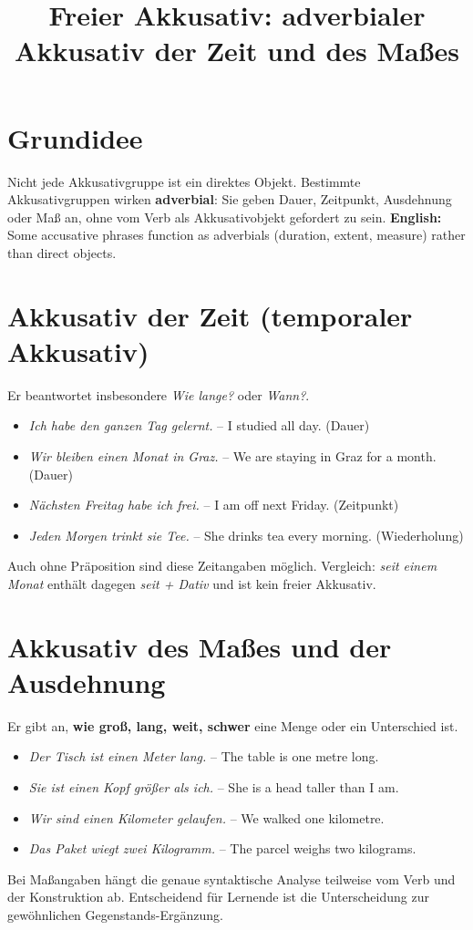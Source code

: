 \documentclass[a4paper,11pt]{article}
\title{Freier Akkusativ: adverbialer Akkusativ der Zeit und des Maßes}\date{}
\begin{document}
\maketitle\tableofcontents
\section{Grundidee}
Nicht jede Akkusativgruppe ist ein direktes Objekt. Bestimmte Akkusativgruppen wirken \textbf{adverbial}: Sie geben Dauer, Zeitpunkt, Ausdehnung oder Maß an, ohne vom Verb als Akkusativobjekt gefordert zu sein.
\textbf{English:} Some accusative phrases function as adverbials (duration, extent, measure) rather than direct objects.

\section{Akkusativ der Zeit (temporaler Akkusativ)}
Er beantwortet insbesondere \textit{Wie lange?} oder \textit{Wann?}.
\begin{itemize}
\item \textit{Ich habe den ganzen Tag gelernt.} -- I studied all day. (Dauer)
\item \textit{Wir bleiben einen Monat in Graz.} -- We are staying in Graz for a month. (Dauer)
\item \textit{Nächsten Freitag habe ich frei.} -- I am off next Friday. (Zeitpunkt)
\item \textit{Jeden Morgen trinkt sie Tee.} -- She drinks tea every morning. (Wiederholung)
\end{itemize}
Auch ohne Präposition sind diese Zeitangaben möglich. Vergleich: \textit{seit einem Monat} enthält dagegen \textit{seit + Dativ} und ist kein freier Akkusativ.

\section{Akkusativ des Maßes und der Ausdehnung}
Er gibt an, \textbf{wie groß, lang, weit, schwer} eine Menge oder ein Unterschied ist.
\begin{itemize}
\item \textit{Der Tisch ist einen Meter lang.} -- The table is one metre long.
\item \textit{Sie ist einen Kopf größer als ich.} -- She is a head taller than I am.
\item \textit{Wir sind einen Kilometer gelaufen.} -- We walked one kilometre.
\item \textit{Das Paket wiegt zwei Kilogramm.} -- The parcel weighs two kilograms.
\end{itemize}
Bei Maßangaben hängt die genaue syntaktische Analyse teilweise vom Verb und der Konstruktion ab. Entscheidend für Lernende ist die Unterscheidung zur gewöhnlichen Gegenstands-Ergänzung.
\end{document}
